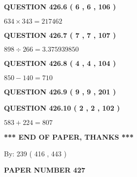 \documentclass{ctexart}
\begin{document}
{\textbf{\Large{QUESTION
426.6 
 ( 6 , 6 , 106 )
}}}
  
  
 
 

$ %
634 \times  %
343=   %
217462$
 
 
  
\vspace{0.2in}
  
{\textbf{\Large{QUESTION
426.7 
 ( 7 , 7 , 107 )
}}}
  
  
 
 

$ %
898 \div  %
266=   %
3.375939850$
 
 
  
\vspace{0.2in}
  
{\textbf{\Large{QUESTION
426.8 
 ( 4 , 4 , 104 )
}}}
  
  
 
 

$ %
850 -  %
140=   %
710$
 
 
  
\vspace{0.2in}
  
{\textbf{\Large{QUESTION
426.9 
 ( 9 , 9 , 201 )
}}}
  
  
  
\vspace{0.2in}
  
{\textbf{\Large{QUESTION
426.10 
 ( 2 , 2 , 102 )
}}}
  
  
 
 

$ %
583 +  %
224=   %
807$
 
 
   
   
 \vspace{0.2in}
 
   
   
   
   
\vspace{1.0in} 
{\textbf{\large{ *** END OF PAPER, THANKS *** }}} 
   
   
\hspace{1.0in} By: 
 239 ( 416 ,  443 )
   
   
   
   
\newpage 
\setcounter{page}{ 
   427001 } 
   
   
   
   
 {\textbf{ \Large{ PAPER NUMBER  427  }}}
   
   
\vspace{0.2in}
   
\end{document}
